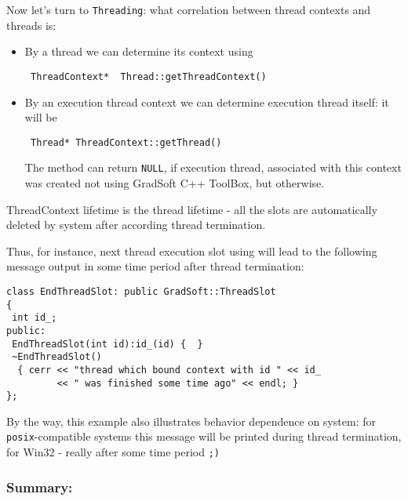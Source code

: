 \documentclass[10pt]{article}
\begin{document}
 Now let's turn to \verb|Threading|:
 what correlation between thread contexts and threads is:
\begin{itemize}
 \item By a thread we can determine its context using
\begin{verbatim}
 ThreadContext*  Thread::getThreadContext()
\end{verbatim}
 \item By an execution thread context we can determine execution thread itself:
 it will be 
\begin{verbatim}
 Thread* ThreadContext::getThread()
\end{verbatim}
 The method can return \verb|NULL|, if execution thread, 
associated with this context was created not using GradSoft C++ ToolBox,
but otherwise.
\end{itemize}

 ThreadContext lifetime is the thread lifetime - all the slots are automatically deleted  
by system after according thread termination.
 
Thus, for instance, next thread execution slot using will lead to the following message 
output in some time period after thread termination:

\begin{verbatim}
class EndThreadSlot: public GradSoft::ThreadSlot
{
 int id_;
public:
 EndThreadSlot(int id):id_(id) {  }
 ~EndThreadSlot() 
  { cerr << "thread which bound context with id " << id_ 
         << " was finished some time ago" << endl; }
};
\end{verbatim}

 By the way, this example also illustrates behavior dependence on system:
for \verb|posix|-compatible systems this message will be printed during 
thread termination, for Win32 - really after some time period 
\verb|;)|


\subsubsection{ Summary: }
\end{document}
